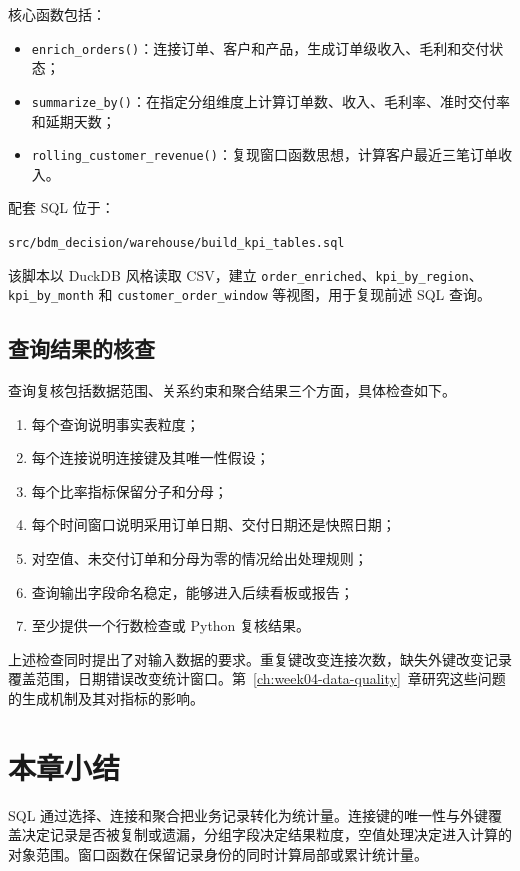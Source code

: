 核心函数包括：
\begin{itemize}
  \item \texttt{enrich\_orders()}：连接订单、客户和产品，生成订单级收入、毛利和交付状态；
  \item \texttt{summarize\_by()}：在指定分组维度上计算订单数、收入、毛利率、准时交付率和延期天数；
  \item \texttt{rolling\_customer\_revenue()}：复现窗口函数思想，计算客户最近三笔订单收入。
\end{itemize}

配套 SQL 位于：
\begin{center}
\texttt{src/bdm\_decision/warehouse/build\_kpi\_tables.sql}
\end{center}

该脚本以 DuckDB 风格读取 CSV，建立 \texttt{order\_enriched}、\texttt{kpi\_by\_region}、\texttt{kpi\_by\_month} 和 \texttt{customer\_order\_window} 等视图，用于复现前述 SQL 查询。

\subsection{查询结果的核查}

查询复核包括数据范围、关系约束和聚合结果三个方面，具体检查如下。
\begin{enumerate}
  \item 每个查询说明事实表粒度；
  \item 每个连接说明连接键及其唯一性假设；
  \item 每个比率指标保留分子和分母；
  \item 每个时间窗口说明采用订单日期、交付日期还是快照日期；
  \item 对空值、未交付订单和分母为零的情况给出处理规则；
  \item 查询输出字段命名稳定，能够进入后续看板或报告；
  \item 至少提供一个行数检查或 Python 复核结果。
\end{enumerate}

上述检查同时提出了对输入数据的要求。重复键改变连接次数，缺失外键改变记录覆盖范围，日期错误改变统计窗口。第~\ref{ch:week04-data-quality}~章研究这些问题的生成机制及其对指标的影响。

\section*{本章小结}

SQL 通过选择、连接和聚合把业务记录转化为统计量。连接键的唯一性与外键覆盖决定记录是否被复制或遗漏，分组字段决定结果粒度，空值处理决定进入计算的对象范围。窗口函数在保留记录身份的同时计算局部或累计统计量。

